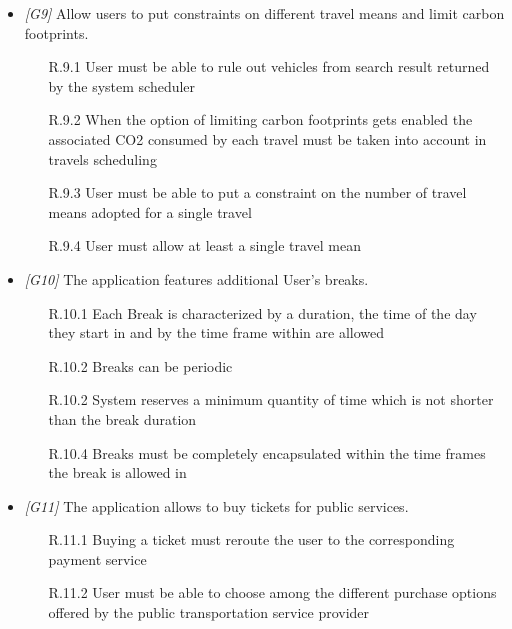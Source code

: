 \begin{itemize}
\item \textit{[G9]} Allow users to put constraints on different travel means and limit carbon footprints.

											\begin{itemize}
											
														\item[R.9.1] User must be able to rule out vehicles from search result returned by the system scheduler
														\item[R.9.2] When the option of limiting carbon footprints gets enabled the associated CO2 consumed by each travel must be taken into account in travels scheduling
														\item[R.9.3] User must be able to put a constraint on the number of travel means adopted for a single travel
														\item[R.9.4] User must allow at least a single travel mean 
																																			
											\end{itemize}



\item \textit{[G10]} The application features additional User’s breaks.

							\begin{enumerate}
							\item [R.10.1] Each Break is characterized by a duration, the time of the day they start in and by the time frame within are allowed
							\item[R.10.2] Breaks can be periodic
						 	\item[R.10.2] System reserves a minimum quantity of time which is not shorter than the break duration
							\item[R.10.4] Breaks must be completely encapsulated within the time frames the break is allowed in	
							\end{enumerate}

\item \textit{[G11]} The application allows to buy tickets for public services.

							\begin{enumerate}
							\item[R.11.1] Buying a ticket must reroute the user to the corresponding payment service
							\item[R.11.2] User must be able to choose among the different purchase options offered by the public transportation service provider
													\end{enumerate}


\end{itemize}

